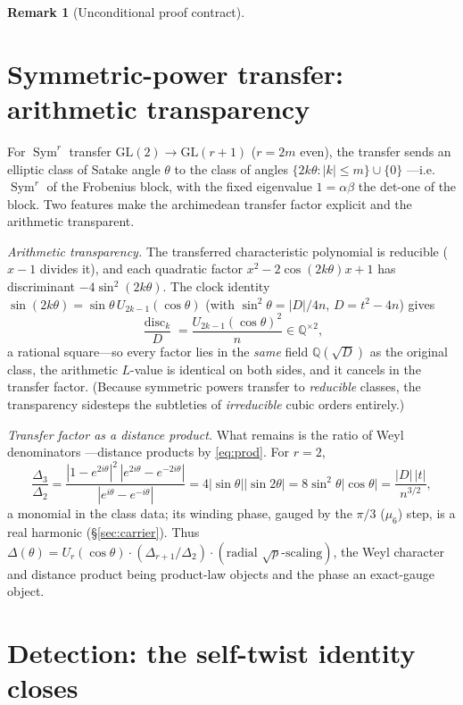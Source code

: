 \documentclass[11pt]{article}
\theoremstyle{definition}
\newtheorem{remark}[theorem]{Remark}
\newcommand{\Sym}{\operatorname{Sym}}
\begin{document}
\begin{remark}[Unconditional proof contract]
\begin{enumerate}
\section{Symmetric-power transfer: arithmetic transparency}\label{sec:fl}

For $\Sym^r$ transfer $\mathrm{GL}(2)\to\mathrm{GL}(r+1)$ ($r=2m$ even), the transfer sends an
elliptic class of Satake angle $\theta$ to the class of angles $\{2k\theta:|k|\le m\}\cup\{0\}$
---i.e. $\Sym^r$ of the Frobenius block, with the fixed eigenvalue $1=\alpha\beta$ the det-one of
the block. Two features make the archimedean transfer factor explicit and the arithmetic transparent.

\emph{Arithmetic transparency.} The transferred characteristic polynomial is reducible ($x-1$
divides it), and each quadratic factor $x^2-2\cos(2k\theta)x+1$ has discriminant $-4\sin^2(2k\theta)$.
The clock identity $\sin(2k\theta)=\sin\theta\,U_{2k-1}(\cos\theta)$ (with $\sin^2\theta=|D|/4n$,
$D=t^2-4n$) gives
\[
  \frac{\operatorname{disc}_k}{D}=\frac{U_{2k-1}(\cos\theta)^2}{n}\in\mathbb Q^{\times2},
\]
a rational square---so every factor lies in the \emph{same} field $\mathbb Q(\sqrt D)$ as the
original class, the arithmetic $L$-value is identical on both sides, and it cancels in the transfer
factor. (Because symmetric powers transfer to \emph{reducible} classes, the transparency sidesteps the
subtleties of \emph{irreducible} cubic orders entirely.)

\emph{Transfer factor as a distance product.} What remains is the ratio of Weyl denominators
---distance products by \eqref{eq:prod}. For $r=2$,
\[
  \frac{\Delta_3}{\Delta_2}
  =\frac{|1-e^{2i\theta}|^2\,|e^{2i\theta}-e^{-2i\theta}|}{|e^{i\theta}-e^{-i\theta}|}
  =4|\sin\theta||\sin2\theta|=8\sin^2\theta|\cos\theta|=\frac{|D|\,|t|}{n^{3/2}},
\]
a monomial in the class data; its winding phase, gauged by the $\pi/3$ ($\mu_6$) step, is a real
harmonic (\S\ref{sec:carrier}). Thus $\Delta(\theta)=U_r(\cos\theta)\cdot(\Delta_{r+1}/\Delta_2)
\cdot(\text{radial }\sqrt p\text{-scaling})$, the Weyl character and distance product being product-law
objects and the phase an exact-gauge object.

\section{Detection: the self-twist identity closes}\label{sec:detect}


\end{enumerate}
\end{remark}
\end{document}
